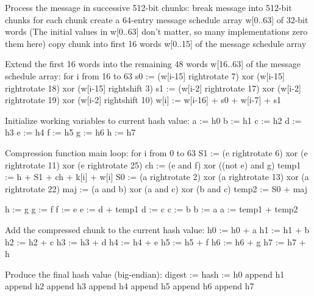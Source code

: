\documentclass{article}
\begin{document}
      Process the message in successive 512-bit chunks:
      break message into 512-bit chunks
      for each chunk
      create a 64-entry message schedule array w[0..63] of 32-bit words
      (The initial values in w[0..63] don't matter, so many implementations zero them here)
      copy chunk into first 16 words w[0..15] of the message schedule array

      Extend the first 16 words into the remaining 48 words w[16..63] of the message schedule array:
      for i from 16 to 63
      s0 := (w[i-15] rightrotate  7) xor (w[i-15] rightrotate 18) xor (w[i-15] rightshift  3)
      s1 := (w[i-2] rightrotate 17) xor (w[i-2] rightrotate 19) xor (w[i-2] rightshift 10)
      w[i] := w[i-16] + s0 + w[i-7] + s1

      Initialize working variables to current hash value:
      a := h0
      b := h1
      c := h2
      d := h3
      e := h4
      f := h5
      g := h6
      h := h7

      Compression function main loop:
      for i from 0 to 63
      S1 := (e rightrotate 6) xor (e rightrotate 11) xor (e rightrotate 25)
      ch := (e and f) xor ((not e) and g)
      temp1 := h + S1 + ch + k[i] + w[i]
      S0 := (a rightrotate 2) xor (a rightrotate 13) xor (a rightrotate 22)
      maj := (a and b) xor (a and c) xor (b and c)
      temp2 := S0 + maj

      h := g
      g := f
      f := e
      e := d + temp1
      d := c
      c := b
      b := a
      a := temp1 + temp2

      Add the compressed chunk to the current hash value:
      h0 := h0 + a
      h1 := h1 + b
      h2 := h2 + c
      h3 := h3 + d
      h4 := h4 + e
      h5 := h5 + f
      h6 := h6 + g
      h7 := h7 + h

      Produce the final hash value (big-endian):
      digest := hash := h0 append h1 append h2 append h3 append h4 append h5 append h6 append h7
\end{document}
